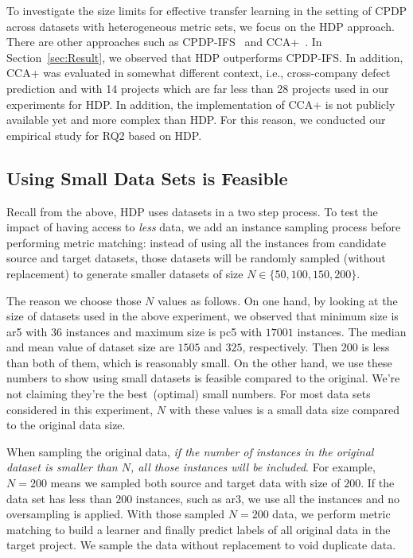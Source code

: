 To investigate the size limits for effective transfer learning in the setting of CPDP across datasets with heterogeneous metric sets, we focus on the HDP approach. There are other approaches such as CPDP-IFS~\cite{He14} and CCA+~\cite{Jing15}. In Section~\ref{sec:Result}, we observed that HDP outperforms CPDP-IFS. In addition, CCA+ was evaluated in somewhat different context, i.e., cross-company defect prediction and with 14 projects which are far less than 28 projects used in our experiments for HDP. In addition, the implementation of CCA+ is not publicly available yet and more complex than HDP. For this reason, we conducted our empirical study for RQ2 based on HDP.



 
\subsection{Using Small Data Sets is Feasible}

Recall from the above,
HDP uses  datasets  in a two step process.
To test the impact of having access to {\em less} data,
we  add an instance sampling process before performing metric matching:
instead of using all the instances from
candidate source and target datasets, those datasets will
be randomly sampled (without replacement) to generate smaller datasets of
size $N \in \{50, 100, 150, 200\}$. 

The reason we choose those $N$ values as follows. On one hand, by looking at the size of datasets used in the
above experiment, we observed that minimum size is ar5 with $36$ instances and maximum size is pc5 with $17001$ instances.
The median and mean value of dataset size are $1505$ and $325$, respectively. Then $200$ is less than both of 
them, which is reasonably small.
On the other hand, we use these numbers to show using small datasets is feasible compared to
the original. We're not claiming they're the best~(optimal) small numbers. For most data sets considered in this experiment, $N$ with these values is a 
small data size compared to the original data size. 

When sampling the original data, {\it if
the number of instances in the original dataset is
smaller than $N$, all those instances will be
included}. For example, $N=200$ means we sampled both source and target data with size of $200$. If the data set has less than $200$ instances, such as ar3, we use all
the instances and no oversampling is applied. With those sampled $N=200$ data, we perform metric matching to build a learner
and finally predict labels of all original data in the target project. We sample the data without replacement
to void duplicate data.

